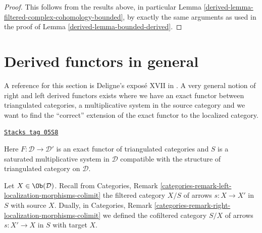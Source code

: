 \begin{proof}

This follows from the results above, in particular
Lemma \ref{derived-lemma-filtered-complex-cohomology-bounded},
by exactly the same arguments as used in the proof of
Lemma \ref{derived-lemma-bounded-derived}.
\end{proof}

\section{Derived functors in general}
\label{derived-section-derived-functors}
A reference for this section is Deligne's expos\'e XVII in \cite{SGA4}.
A very general notion of right and left derived functors exists where
we have an exact functor between triangulated categories, a multiplicative
system in the source category and we want to find the ``correct'' extension
of the exact functor to the localized category.

\begin{definition}
\label{derived-situation-derived-functor}
\href{https://stacks.math.columbia.edu/tag/05S8}{\texttt{Stacks tag 05S8}}

Here $F : \mathcal{D} \to \mathcal{D}'$ is an exact functor of triangulated
categories and $S$ is a saturated multiplicative
system in $\mathcal{D}$ compatible with the structure
of triangulated category on $\mathcal{D}$.
\end{definition}

Let $X \in \Ob(\mathcal{D})$. Recall from
Categories, Remark \ref{categories-remark-left-localization-morphisms-colimit}
the filtered category $X/S$ of arrows $s : X \to X'$ in $S$ with source $X$.
Dually, in
Categories, Remark \ref{categories-remark-right-localization-morphisms-colimit}
we defined the cofiltered category $S/X$ of arrows $s : X' \to X$ in $S$
with target $X$.

